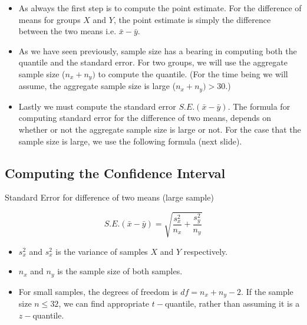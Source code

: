 \documentclass[a4paper,12pt]{article}
\begin{document}
\begin{itemize}
\item As always the first step is to compute the point estimate. For the difference of means for groups $X$ and $Y$, the point estimate is simply the difference between the two means i.e. $\bar{x} - \bar{y}$.

\item As we have seen previously, sample size has a bearing in computing both the quantile and the standard error.
For two groups, we will use the aggregate sample size ($n_x+n_y)$ to compute the quantile. (For the time being we will assume, the aggregate sample size is large ($n_x+n_y)> 30$.)

\item Lastly we must compute the standard error $S.E.(\bar{x}-\bar{y})$. The formula for computing standard error for the difference of two means, depends on whether or not the aggregate sample size is large or not. For the case that the sample size is large, we use the following formula (next slide).
\end{itemize}



\subsection*{Computing the Confidence Interval}
Standard Error for difference of two means (large sample)

\[ S.E.(\bar{x}-\bar{y}) = \sqrt{\frac{s^2_x}{n_x} + \frac{s^2_y}{n_y}} \]

\begin{itemize}
\item $s^2_x$ and $s^2_x$ is the variance of samples $X$ and $Y$ respectively.
\item $n_x$ and $n_y$ is the sample size of both samples.\bigskip

\item For small samples, the degrees of freedom is $df = n_x + n_y - 2$. If the sample size $n \leq 32$, we can find appropriate $t-$quantile, rather than assuming it is a $z-$quantile.
\end{itemize}


\end{document}
